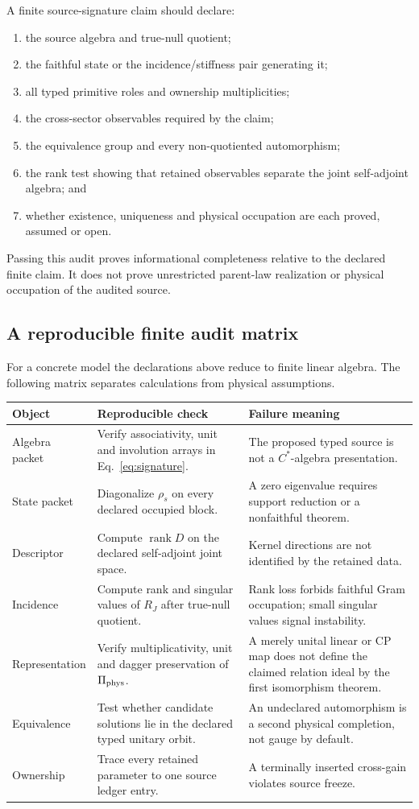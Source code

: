 \documentclass[11pt]{article}
\begin{document}
A finite source-signature claim should declare:
\begin{enumerate}[label=(S\arabic*)]
 \item the source algebra and true-null quotient;
 \item the faithful state or the incidence/stiffness pair generating it;
 \item all typed primitive roles and ownership multiplicities;
 \item the cross-sector observables required by the claim;
 \item the equivalence group and every non-quotiented automorphism;
 \item the rank test showing that retained observables separate the joint
 self-adjoint algebra; and
 \item whether existence, uniqueness and physical occupation are each proved,
 assumed or open.
\end{enumerate}

Passing this audit proves informational completeness relative to the declared
finite claim.  It does not prove unrestricted parent-law realization or
physical occupation of the audited source.

\subsection{A reproducible finite audit matrix}

For a concrete model the declarations above reduce to finite linear algebra.
The following matrix separates calculations from physical assumptions.
\begin{longtable}{p{.27\linewidth}p{.32\linewidth}p{.31\linewidth}}
\toprule
Object & Reproducible check & Failure meaning\\
\midrule
Algebra packet & Verify associativity, unit and involution arrays in
Eq.~\eqref{eq:signature}. & The proposed typed source is not a
\(C^*\)-algebra presentation.\\
State packet & Diagonalize \(\rho_s\) on every declared occupied block. & A
zero eigenvalue requires support reduction or a nonfaithful theorem.\\
Descriptor & Compute \(\operatorname{rank}D\) on the declared self-adjoint
joint space. & Kernel directions are not identified by the retained data.\\
Incidence & Compute rank and singular values of \(R_J\) after true-null
quotient. & Rank loss forbids faithful Gram occupation; small singular values
signal instability.\\
Representation & Verify multiplicativity, unit and dagger preservation of
\(\Pi_{\rm phys}\). & A merely unital linear or CP map does not define the
claimed relation ideal by the first isomorphism theorem.\\
Equivalence & Test whether candidate solutions lie in the declared typed
unitary orbit. & An undeclared automorphism is a second physical completion,
not gauge by default.\\
Ownership & Trace every retained parameter to one source ledger entry. & A
terminally inserted cross-gain violates source freeze.\\
\bottomrule
\end{longtable}
\end{document}
